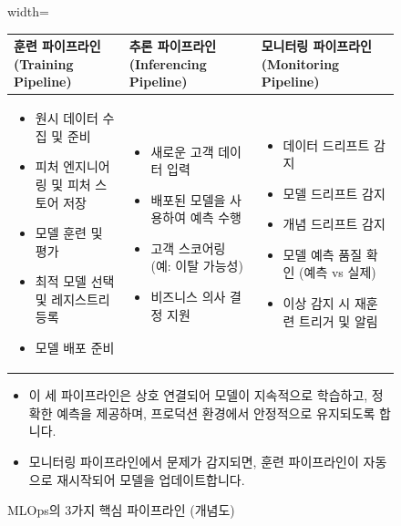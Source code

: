 \documentclass[11pt,a4paper]{article}
\theoremstyle{definition}
\begin{document}
\begin{figure}[h!]
    \centering
    \caption{MLOps의 3가지 핵심 파이프라인 (개념도)}
    \label{fig:mlops_three_pipelines}
    \begin{adjustbox}{width=\textwidth}
    \begin{tabular}{p{} | p{} | p{}}
    \toprule
    \textbf{훈련 파이프라인 (Training Pipeline)} & \textbf{추론 파이프라인 (Inferencing Pipeline)} & \textbf{모니터링 파이프라인 (Monitoring Pipeline)} \\
    \midrule
    \begin{itemize}
        \item 원시 데이터 수집 및 준비
        \item 피처 엔지니어링 및 피처 스토어 저장
        \item 모델 훈련 및 평가
        \item 최적 모델 선택 및 레지스트리 등록
        \item 모델 배포 준비
    \end{itemize} &
    \begin{itemize}
        \item 새로운 고객 데이터 입력
        \item 배포된 모델을 사용하여 예측 수행
        \item 고객 스코어링 (예: 이탈 가능성)
        \item 비즈니스 의사 결정 지원
    \end{itemize} &
    \begin{itemize}
        \item 데이터 드리프트 감지
        \item 모델 드리프트 감지
        \item 개념 드리프트 감지
        \item 모델 예측 품질 확인 (예측 vs 실제)
        \item 이상 감지 시 재훈련 트리거 및 알림
    \end{itemize} \\
    \bottomrule
    \end{tabular}
    \end{adjustbox}
    \vspace{1em}
    \begin{itemize}
        \item 이 세 파이프라인은 상호 연결되어 모델이 지속적으로 학습하고, 정확한 예측을 제공하며, 프로덕션 환경에서 안정적으로 유지되도록 합니다.
        \item 모니터링 파이프라인에서 문제가 감지되면, 훈련 파이프라인이 자동으로 재시작되어 모델을 업데이트합니다.
    \end{itemize}
\end{figure}
\end{document}
